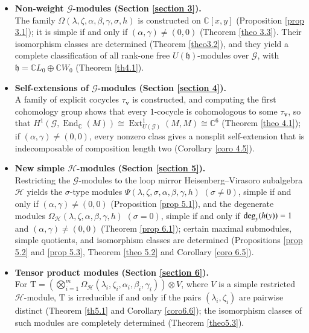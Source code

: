\documentclass[12pt,reqno]{amsart}
\def\deg{{\rm deg}}
\numberwithin{equation}{section}
\begin{document}
\begin{itemize}
    \item \textbf{ Non-weight \(\mathcal{G}\)-modules (Section \ref{section 3}).} \\
    The family \(\Omega(\lambda,\zeta,\alpha,\beta,\gamma,\sigma,h)\) is constructed on \(\mathbb{C}[x,y]\) (Proposition \ref{prop 3.1}); it is simple if and only if \((\alpha,\gamma)\neq(0,0)\) (Theorem \ref{theo 3.3}). Their isomorphism classes are determined (Theorem \ref{theo3.2}), and they yield a complete classification of all rank-one free \(U(\mathfrak{h})\)-modules over \(\mathcal{G}\), with \(\mathfrak{h}=\mathbb{C}L_0\oplus\mathbb{C}W_0\) (Theorem \ref{th4.1}).
    
    \item \textbf{Self-extensions of \(\mathcal{G}\)-modules (Section \ref{section 4}).} \\
    A family of explicit cocycles \(\tau_{\boldsymbol{v}}\) is constructed, and computing the first cohomology group shows that every \(1\)-cocycle is cohomologous to some \(\tau_{\boldsymbol{v}}\), so that \(H^1(\mathcal{G},\operatorname{End}_{\mathbb{C}}(M))\cong \operatorname{Ext}^1_{U(\mathcal{G})}(M,M)\cong \mathbb{C}^6\) (Theorem \ref{theo 4.1}); if $(\alpha,\gamma)\neq (0,0)$,  every nonzero class gives a nonsplit self-extension that is indecomposable of composition length two (Corollary \ref{coro 4.5}).

    \item \textbf{New simple \(\mathcal{H}\)-modules (Section \ref{section 5}).} \\
    Restricting the \(\mathcal{G}\)-modules to the loop mirror Heisenberg--Virasoro subalgebra \(\mathcal{H}\) yields the \(\sigma\)-type modules \(\Psi(\lambda,\zeta,\sigma,\alpha,\beta,\gamma,h)\) \((\sigma\neq0)\), simple if and only if \((\alpha,\gamma)\neq(0,0)\) (Proposition \ref{prop 5.1}), and the degenerate modules \(\Omega_{\mathcal{H}}(\lambda,\zeta,\alpha,\beta,\gamma,h)\) \((\sigma=0)\), simple if and only if \(\deg_y(h(y))=1\) and \((\alpha,\gamma)\neq(0,0)\) (Theorem \ref{prop 6.1}); certain maximal submodules, simple quotients, and isomorphism classes are determined (Propositions \ref{prop 5.2} and \ref{prop 5.3}, Theorem \ref{theo 5.2} and Corollary \ref{coro 6.5}).

    \item \textbf{Tensor product modules (Section \ref{section 6}).} \\
    For \(\mathrm{T} = \left(\bigotimes_{i=1}^{m} \Omega_{\mathcal{H}}(\lambda_i, \zeta_i, \alpha_i, \beta_i, \gamma_i)\right) \otimes V\), where \(V\) is a simple restricted \(\mathcal{H}\)-module, \(\mathrm{T}\) is irreducible if and only if the pairs \((\lambda_i,\zeta_i)\) are pairwise distinct (Theorem \ref{th5.1} and Corollary \ref{coro6.6}); the isomorphism classes of such modules are completely determined (Theorem \ref{theo5.3}).
\end{itemize}
\end{document}
